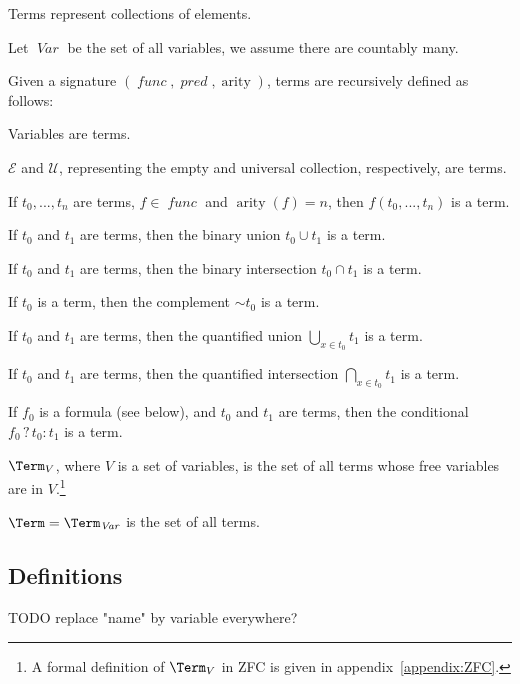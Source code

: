 \documentclass[oneside,12pt]{book}
\theoremstyle{definition}
\theoremstyle{remark}
\newcommand\var[1]{\mathop{\mathit{#1}}\nolimits}
\DeclareMathOperator{\arity}{arity}
\newcommand{\Var}{\var{Var}}
\newcommand{\conditional}[3]{#1 \mathrel{?} #2 : #3}
\newcommand{\Empty}{\mathcal{E}}
\newcommand{\Universal}{\mathcal{U}}
\newcommand{\func}{\var{func}}
\newcommand{\pred}{\var{pred}} %
\begin{document}
\noindent Terms represent collections of elements.

\begin{defBox}
  Let $\Var$ be the set of all variables, we assume there are countably many.
\end{defBox}

\noindent Given a signature $(\func, \pred, \arity)$, terms are
recursively defined as follows:

\begin{compactenum}
  \item Variables are terms.
  \item $\Empty$ and $\Universal$, representing the empty and universal collection,
    respectively, are terms.
  \item If $t_0, ..., t_n$ are terms, $f \in \func$ and $\arity(f) = n$,
    then $f(t_0, ..., t_n)$ is a term.
  \item If $t_0$ and $t_1$ are terms, then the binary union $t_0 \cup t_1$ is a term.
  \item If $t_0$ and $t_1$ are terms, then the binary intersection $t_0 \cap t_1$ is a term.
  \item If $t_0$ is a term, then the complement $\sim t_0$ is a term.
  \item If $t_0$ and $t_1$ are terms, then the quantified union
    $\displaystyle \bigcup_{x \in t_0} t_1$ is a term.
  \item If $t_0$ and $t_1$ are terms, then the quantified intersection
    $\displaystyle \bigcap_{x \in t_0} t_1$ is a term.
  \item If $f_0$ is a formula (see below), and $t_0$ and $t_1$ are terms,
    then the conditional $\conditional{f_0}{t_0}{t_1}$ is a term.
\end{compactenum}

\begin{defBox}
  $\Term_V$, where $V$ is a set of variables, is the set of all
  terms whose free variables are in $V$.\footnote{A formal definition of
  $\Term_V$ in ZFC is given in appendix~\ref{appendix:ZFC}.}
  
  \medskip \noindent $\Term = \Term_{\Var}$ is the set of all terms.
\end{defBox}

\subsection{Definitions}

TODO replace "name" by variable everywhere?
\end{document}

